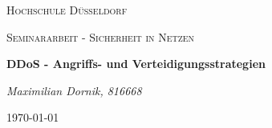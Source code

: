 \begin{titlepage}
\centering
\scshape\LARGE Hochschule Düsseldorf

\scshape\Large Seminararbeit - Sicherheit in Netzen\par

\huge\textbf{DDoS - Angriffs- und Verteidigungsstrategien}\par

\Large\itshape Maximilian Dornik, 816668\par

\large \today
\end{titlepage}